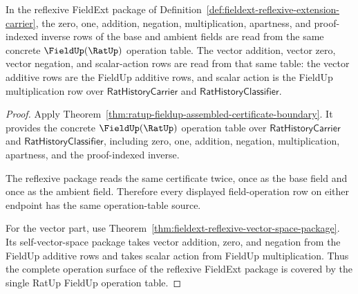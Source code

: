 \begin{theorem}
\label{thm:fieldext-ratup-reflexive-operation-table-source-coverage}
In the reflexive FieldExt package of
Definition~\ref{def:fieldext-reflexive-extension-carrier}, the zero, one,
addition, negation, multiplication, apartness, and proof-indexed inverse rows
of the base and ambient fields are read from the same concrete
$\FieldUp(\RatUp)$ operation table. The vector addition, vector zero, vector
negation, and scalar-action rows are read from that same table: the vector
additive rows are the FieldUp additive rows, and scalar action is the FieldUp
multiplication row over $\mathsf{RatHistoryCarrier}$ and
$\mathsf{RatHistoryClassifier}$.
\end{theorem}
\begin{proof}
Apply Theorem~\ref{thm:ratup-fieldup-assembled-certificate-boundary}. It
provides the concrete $\FieldUp(\RatUp)$ operation table over
$\mathsf{RatHistoryCarrier}$ and $\mathsf{RatHistoryClassifier}$, including
zero, one, addition, negation, multiplication, apartness, and the
proof-indexed inverse.

The reflexive package reads the same certificate twice, once as the base field
and once as the ambient field. Therefore every displayed field-operation row
on either endpoint has the same operation-table source.

For the vector part, use
Theorem~\ref{thm:fieldext-reflexive-vector-space-package}. Its self-vector-space
package takes vector addition, zero, and negation from the FieldUp additive
rows and takes scalar action from FieldUp multiplication. Thus the complete
operation surface of the reflexive FieldExt package is covered by the single
RatUp FieldUp operation table.
\end{proof}

